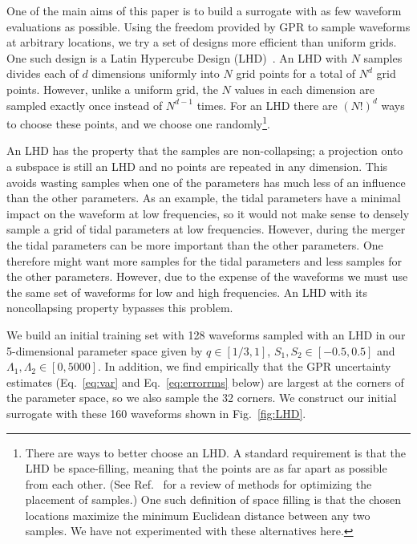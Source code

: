 \documentclass[prd,aps,letter,twocolumn,floatfix,notitlepage,nofootinbib]{revtex4-1}
\begin{document}
One of the main aims of this paper is to build a surrogate with as few waveform evaluations as possible. Using the freedom provided by GPR to sample waveforms at arbitrary locations, we try a set of designs more efficient than uniform grids. One such design is a Latin Hypercube Design (LHD)~\cite{McKayBeckmanConover1979}. An LHD with $N$ samples divides each of $d$ dimensions uniformly into $N$ grid points for a total of $N^d$ grid points. However, unlike a uniform grid, the $N$ values in each dimension are sampled exactly once instead of $N^{d-1}$ times. For an LHD there are $(N!)^d$ ways to choose these points, and we choose one randomly\footnote{There are ways to better choose an LHD. A standard requirement is that the LHD be space-filling, meaning that the points are as far apart as possible from each other. (See Ref.~\cite{Husslage2011} for a review of methods for optimizing the placement of samples.) One such definition of space filling is that the chosen locations maximize the minimum Euclidean distance between any two samples. We have not experimented with these alternatives here.}. 

An LHD has the property that the samples are non-collapsing; a projection onto a subspace is still an LHD and no points are repeated in any dimension. This avoids wasting samples when one of the parameters has much less of an influence than the other parameters. As an example, the tidal parameters have a minimal impact on the waveform at low frequencies, so it would not make sense to densely sample a grid of tidal parameters at low frequencies. However, during the merger the tidal parameters can be more important than the other parameters. One therefore might want more samples for the tidal parameters and less samples for the other parameters. However, due to the expense of the waveforms we must use the same set of waveforms for low and high frequencies. An LHD with its noncollapsing property bypasses this problem. 

We build an initial training set with 128 waveforms sampled with an LHD in our 5-dimensional parameter space given by $q\in[1/3, 1]$, $S_1, S_2 \in [-0.5, 0.5]$ and $\Lambda_1, \Lambda_2 \in [0, 5000]$. In addition, we find empirically that the GPR uncertainty estimates (Eq.~\eqref{eq:var} and Eq.~\eqref{eq:errorrms} below) are largest at the corners of the parameter space, so we also sample the 32 corners. We construct our initial surrogate with these 160 waveforms shown in Fig.~\ref{fig:LHD}.
\end{document}
